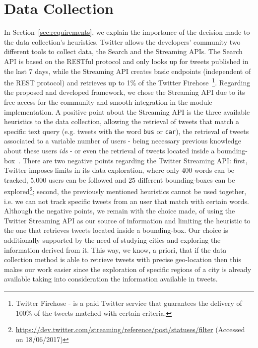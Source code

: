 \section{Data Collection}\label{sec:data_collection}

In Section~\ref{sec:requirements}, we explain the importance of the decision made to the data collection's heuristics. Twitter allows the developers' community two different tools to collect data, the Search and the Streaming APIs. The Search API is based on the RESTful protocol and only looks up for tweets published in the last 7 days, while the Streaming API creates basic endpoints (independent of the REST protocol) and retrieves up to 1\% of the Twitter Firehose~\footnote{Twitter Firehose - is a paid Twitter service that guarantees the delivery of 100\% of the tweets matched with certain criteria.}. Regarding the proposed and developed framework, we chose the Streaming API due to its free-access for the community and smooth integration in the module implementation. A positive point about the Streaming API is the three available heuristics to the data collection, allowing the retrieval of tweets that match a specific text query (e.g. tweets with the word \texttt{bus} or \texttt{car}), the retrieval of tweets associated to a variable  number of users - being necessary previous knowledge about these users \textit{ids} - or even the retrieval of tweets located inside a bounding-box~\cite{mac2016effects}. There are two negative points regarding the Twitter Streaming API: first, Twitter imposes limits in its data exploration, where only 400 words can be tracked, 5,000 users can be followed and 25 different bounding-boxes can be explored\footnote{\url{https://dev.twitter.com/streaming/reference/post/statuses/filter} (Accessed on 18/06/2017)}; second, the previously mentioned heuristics cannot be used together, i.e. we can not track specific tweets from an user that match with certain words. Although the negative points, we remain with the choice made, of using the Twitter Streaming API as our source of information and limiting the heuristic to the one that retrieves tweets located inside a bounding-box. Our choice is additionally supported by the need of studying cities and exploring the information derived from it. This way, we know, a priori, that if the data collection method is able to retrieve tweets with precise geo-location then this makes our work easier since the exploration of specific regions of a city is already available taking into consideration the information available in tweets.

